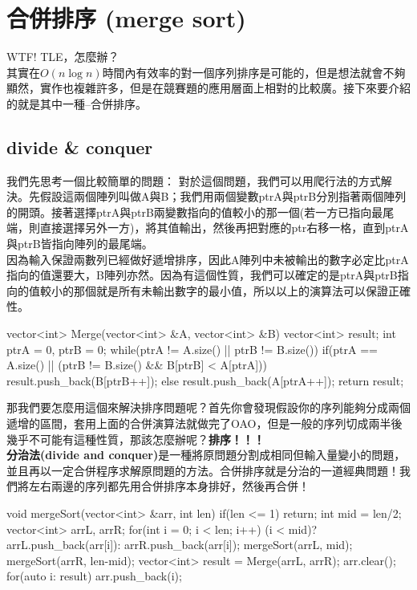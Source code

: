 \documentclass[main.tex]{subfiles}
\begin{document}
\section{合併排序 (merge sort)}
WTF! TLE，怎麼辦？\\
其實在$O(n\log n)$時間內有效率的對一個序列排序是可能的，但是想法就會不夠顯然，實作也複雜許多，但是在競賽題的應用層面上相對的比較廣。接下來要介紹的就是其中一種--合併排序。
\subsection{divide \& conquer}
我們先思考一個比較簡單的問題：
對於這個問題，我們可以用爬行法的方式解決。先假設這兩個陣列叫做A與B；我們用兩個變數ptrA與ptrB分別指著兩個陣列的開頭。接著選擇ptrA與ptrB兩變數指向的值較小的那一個(若一方已指向最尾端，則直接選擇另外一方)，將其值輸出，然後再把對應的ptr右移一格，直到ptrA與ptrB皆指向陣列的最尾端。\\
\indent 因為輸入保證兩數列已經做好遞增排序，因此A陣列中未被輸出的數字必定比ptrA指向的值還要大，B陣列亦然。因為有這個性質，我們可以確定的是ptrA與ptrB指向的值較小的那個就是所有未輸出數字的最小值，所以以上的演算法可以保證正確性。
\begin{C++}
vector<int> Merge(vector<int> &A, vector<int> &B){
    vector<int> result;
    int ptrA = 0, ptrB = 0;
    while(ptrA != A.size() || ptrB != B.size()){
        if(ptrA == A.size() || (ptrB != B.size() && B[ptrB] < A[ptrA]))
            result.push_back(B[ptrB++]);
        else result.push_back(A[ptrA++]);
    }
    return result;
}
\end{C++}
\indent\indent 那我們要怎麼用這個來解決排序問題呢？首先你會發現假設你的序列能夠分成兩個遞增的區間，套用上面的合併演算法就做完了OAO，但是一般的序列切成兩半後幾乎不可能有這種性質，那該怎麼辦呢？\textbf{排序！！！}\\
\indent\indent\textbf{分治法(divide and conquer)}是一種將原問題分割成相同但輸入量變小的問題，並且再以一定合併程序求解原問題的方法。合併排序就是分治的一道經典問題！我們將左右兩邊的序列都先用合併排序本身排好，然後再合併！\\
\begin{C++}
void mergeSort(vector<int> &arr, int len){
    if(len <= 1) return;
    int mid = len/2;
    vector<int> arrL, arrR;
    for(int i = 0; i < len; i++)
        (i < mid)? arrL.push_back(arr[i]):
                   arrR.push_back(arr[i]);
    mergeSort(arrL, mid);
    mergeSort(arrR, len-mid);
    vector<int> result = Merge(arrL, arrR);
    arr.clear();
    for(auto i: result) arr.push_back(i);
}
\end{C++}
\end{document}
